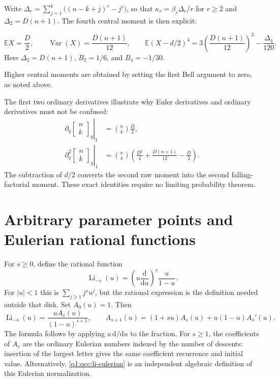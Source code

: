 \documentclass[11pt,a4paper,oneside,openany]{book}
\theoremstyle{definition}
\theoremstyle{remark}
\newcommand{\GB}[3][q]{\begin{bmatrix}#2\\#3\end{bmatrix}_{#1}}
\DeclareMathOperator{\Li}{Li}
\newcommand{\G}[2]{\GB{#1}{#2}}
\begin{document}
Write \(\Delta_r=\sum_{j=1}^{k}\bigl((n-k+j)^r-j^r\bigr)\), so that
\(\kappa_r=\beta_r\Delta_r/r\) for \(r\ge2\) and \(\Delta_2=D(n+1)\). The
fourth central moment is then explicit:

\begin{equation}
 \mathbb E X=\frac D2,\qquad
 \operatorname{Var}(X)=\frac{D(n+1)}{12},\qquad
 \mathbb E(X-d/2)^4
     =3\left(\frac{D(n+1)}{12}\right)^2-\frac{\Delta_4}{120}.
 \label{q3:eq:area-moments}
\end{equation}
Here $\Delta_2=D(n+1)$, $B_2=1/6$, and $B_4=-1/30$.

Higher central moments are obtained by setting the first Bell argument to
zero, as noted above.

The first two ordinary derivatives illustrate why Euler derivatives
and ordinary derivatives must not be confused:
\begin{align}
 \left.\partial_q\G nk\right|_1&=\binom nk\frac D2,
 \label{q3:eq:gaussian-first-q-one}\\
 \left.\partial_q^2\G nk\right|_1
   &=\binom nk\left(\frac{D^2}{4}
             +\frac{D(n+1)}{12}-\frac D2\right).
 \label{q3:eq:gaussian-second-q-one}
\end{align}
The subtraction of $d/2$ converts the second raw moment into the second
falling-factorial moment. These exact identities require no limiting
probability theorem.
\section{Arbitrary parameter points and Eulerian rational functions}
For \(s\ge0\), define the rational function
\[
 \Li_{-s}(u)=\left(u\frac{\mathrm d}{\mathrm du}\right)^s\frac{u}{1-u}.
\]
For \(|u|<1\) this is \(\sum_{j\ge1}j^su^j\), but the rational
expression is the definition needed outside that disk. Set \(A_0(u)=1\).
Then
\begin{equation}\label{q1:qcc:li-eulerian}
 \Li_{-s}(u)=\frac{uA_s(u)}{(1-u)^{s+1}},\qquad
 A_{s+1}(u)=(1+su)A_s(u)+u(1-u)A_s'(u).
\end{equation}
The formula follows by applying \(u\,\mathrm d/\mathrm du\) to the
fraction. For \(s\ge1\), the coefficients of \(A_s\) are the ordinary
Eulerian numbers indexed by the number of descents: insertion of the largest
letter gives the same coefficient recurrence and initial value. Alternatively,
\eqref{q1:qcc:li-eulerian} is an independent algebraic definition of this
Eulerian normalization.
\end{document}
